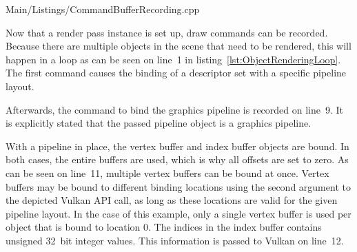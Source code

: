 
      
      {Main/Listings/CommandBufferRecording.cpp}

      Now that a render pass instance is set up, draw commands can be recorded.
      Because there are multiple objects in the scene that need to be rendered, this will happen in a loop as can be seen on line~1 in listing~\ref{lst:ObjectRenderingLoop}.
      The first command causes the binding of a descriptor set with a specific pipeline layout.

      Afterwards, the command to bind the graphics pipeline is recorded on line~9.
      It is explicitly stated that the passed pipeline object is a graphics pipeline.

      With a pipeline in place, the vertex buffer and index buffer objects are bound.
      In both cases, the entire buffers are used, which is why all offsets are set to zero.
      As can be seen on line~11, multiple vertex buffers can be bound at once.
      Vertex buffers may be bound to different binding locations using the second argument to the depicted Vulkan API call, as long as these locations are valid for the given pipeline layout.
      In the case of this example, only a single vertex buffer is used per object that is bound to location 0.
      The indices in the index buffer contains unsigned 32~bit integer values.
      This information is passed to Vulkan on line~12.

